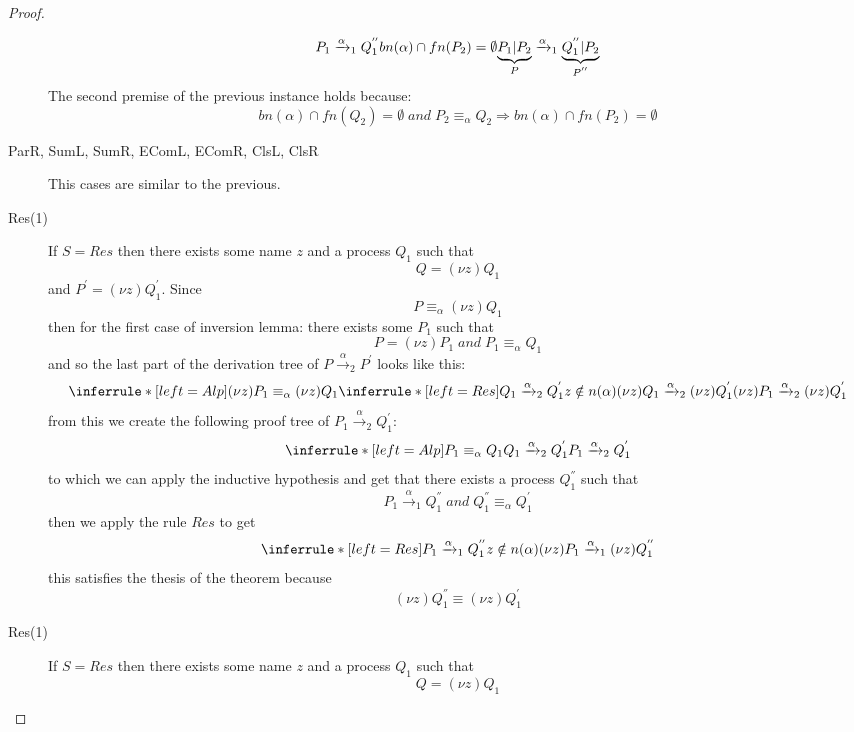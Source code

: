 \begin{theorem}
\begin{proof}
\begin{description}
\[{		  P_{1}\xrightarrow{\alpha}_{1}Q_{1}^{''} 
		\\
		  bn(\alpha) \cap fn(P_{2})=\emptyset
	      }{
		\underbrace{P_{1}|P_{2}}_{P}\xrightarrow{\alpha}_{1}\underbrace{Q_{1}^{''}|P_{2}}_{P^{''}}
	      }
	    \]
	    The second premise of the previous instance holds because:
	    \[
	      bn(\alpha)\cap fn(Q_{2})=\emptyset\; and\; P_{2}\equiv_{\alpha}Q_{2}\Rightarrow bn(\alpha)\cap fn(P_{2})=\emptyset
	    \]
	  \item[ParR, SumL, SumR, EComL, EComR, ClsL, ClsR] 
	    This cases are similar to the previous.
	  \item[Res(1)]
	    If $S=Res$ then there exists some name $z$ and a process $Q_{1}$ such that 
	    \[
	      Q=(\nu z)Q_{1}
	    \]
	    and $P^{'}=(\nu z)Q_{1}^{'}$. Since 
	    \[
	      P\equiv_{\alpha}(\nu z)Q_{1}
	    \]
	    then for the first case of inversion lemma:
		there exists some $P_{1}$ such that 
		\[
		  P=(\nu z)P_{1}\; and\; P_{1}\equiv_{\alpha}Q_{1}
		\]
		and so the last part of the derivation tree of $P\xrightarrow{\alpha}_{2}P^{'}$ looks like this:
		\[
		  \inferrule* [left=Alp]{
		      (\nu z)P_{1}\equiv_{\alpha}(\nu z)Q_{1}
		    \\
		      \inferrule* [left=Res]{
			  Q_{1}\xrightarrow{\alpha}_{2}Q_{1}^{'}
			\\
			  z\notin n(\alpha)
		      }{
			(\nu z)Q_{1}\xrightarrow{\alpha}_{2}(\nu z)Q_{1}^{'}
		      }
		  }{
		    (\nu z)P_{1}\xrightarrow{\alpha}_{2}(\nu z)Q_{1}^{'}
		  }
		\]
		from this we create the following proof tree of $P_{1}\xrightarrow{\alpha}_{2}Q_{1}^{'}$:
		\[
		  \inferrule* [left=Alp]{
		      P_{1}\equiv_{\alpha}Q_{1}
		    \\
		      Q_{1}\xrightarrow{\alpha}_{2}Q_{1}^{'}
		  }{
		    P_{1}\xrightarrow{\alpha}_{2}Q_{1}^{'}
		  }		
		\]
		to which we can apply the inductive hypothesis and get that there exists a process $Q_{1}^{''}$ such that
		\[
		  P_{1}\xrightarrow{\alpha}_{1}Q_{1}^{''}\;and\; Q_{1}^{''}\equiv_{\alpha}Q_{1}^{'}
		\]
		then we apply the rule $Res$ to get
		\[
		      \inferrule* [left=Res]{
			  P_{1}\xrightarrow{\alpha}_{1}Q_{1}^{''}
			\\
			  z\notin n(\alpha)
		      }{
			(\nu z)P_{1}\xrightarrow{\alpha}_{1}(\nu z)Q_{1}^{''}
		      }		 
		\]
		this satisfies the thesis of the theorem because  
		\[
		  (\nu z)Q_{1}^{''}\equiv(\nu z)Q_{1}^{'}
		\]
	  \item[Res(1)]
	    If $S=Res$ then there exists some name $z$ and a process $Q_{1}$ such that 
	    \[
	      Q=(\nu z)Q_{1}
\]
\end{description}
\end{proof}
\end{theorem}
